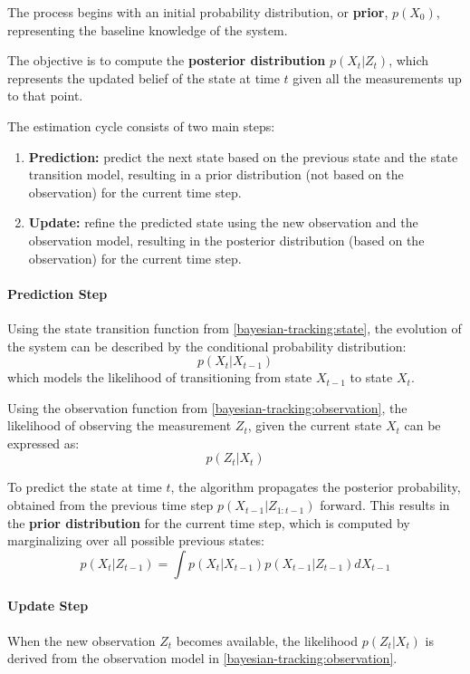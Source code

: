 The process begins with an initial probability distribution, or \textbf{prior}, $p(X_0)$, 
representing the baseline knowledge of the system. 

The objective is to compute the \textbf{posterior distribution} $p(X_t | Z_{t})$, which represents the updated belief of the state at time 
$t$ given all the measurements up to that point.

The estimation cycle consists of two main steps:
\begin{enumerate}
    \item \textbf{Prediction:} predict the next state based on the previous state and the state transition model, 
    resulting in a prior distribution (not based on the observation) for the current time step.
    \item \textbf{Update:} refine the predicted state using the new observation and the observation model, 
    resulting in the posterior distribution (based on the observation) for the current time step.
\end{enumerate}

\paragraph{Prediction Step}
Using the state transition function from \ref{bayesian-tracking:state}, the evolution of the system can be described by the conditional probability distribution:
\[ p(X_t | X_{t-1}) \]
which models the likelihood of transitioning from state $X_{t-1}$ to state $X_t$.

Using the observation function from \ref{bayesian-tracking:observation}, the likelihood of observing the measurement $Z_t$, 
given the current state $X_t$ can be expressed as:
\[ p(Z_t | X_t) \]

To predict the state at time $t$, the algorithm propagates the posterior probability, obtained from the previous time step 
$p(X_{t-1} | Z_{1:t-1})$ forward.
This results in the \textbf{prior distribution} for the current time step, which is computed by marginalizing 
over all possible previous states:
\[ p(X_t | Z_{t-1}) = \int p(X_t | X_{t-1}) p(X_{t-1} | Z_{t-1}) dX_{t-1} \]

\paragraph{Update Step}
When the new observation $Z_t$ becomes available, the likelihood $p(Z_t | X_t)$ is derived from the observation model in \ref{bayesian-tracking:observation}.

